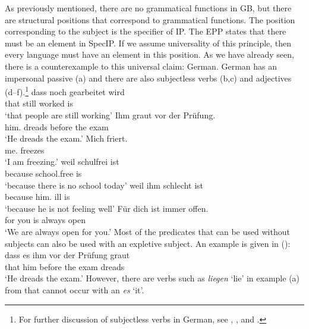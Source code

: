 As previously mentioned, there are no grammatical functions in GB, but there are structural positions that correspond to grammatical functions.
The position corresponding to the subject is the specifier of IP. The EPP states that there must be an element in SpecIP. If we assume universality
of this principle, then every language must have an element in this position. As we have already seen, there is a counterexample to this
universal claim: German. German has an impersonal passive (a) and there are also subjectless verbs (b,c) and adjectives (d--f).\footnote{%
	For further discussion of subjectless verbs in German, see , ,
    and .
}
\eal
\ex 
\gll dass noch gearbeitet wird\\
	 that still worked is\\
\glt `that people are still working'
\ex 
\gll Ihm graut vor der Prüfung.\\
     him.\dat{} dreads before the exam\\
\glt `He dreads the exam.'
\ex 
\gll Mich friert.\\
	 me.\acc{} freezes\\
\glt `I am freezing.'
\ex\label{ex-schulfrei}
\gll weil schulfrei ist\\
	 because school.free is\\
\glt `because there is no school today'
\ex\label{ex-schlecht-ist}
\gll weil ihm schlecht ist\\
	 because him.\dat{} ill is\\
\glt `because he is not feeling well'
\ex\label{ex-fuer-dich-ist-immer-offen}
\gll Für dich ist immer offen.\footnotemark\\
	 for you is always open\\
\glt `We are always open for you.'
\zl
Most of the predicates that can be used without subjects can also be used with an expletive
subject. An example is given in ():
\ea
\gll dass es ihm vor der Prüfung graut\\
	 that \expl{} him before the exam dreads\\
\glt `He dreads the exam.'
\z
However, there are verbs such as \emph{liegen} `lie' in example (a) from \citet[]{Reis82} that cannot occur with
an \emph{es} `it'.

\eal
{}
\zl

